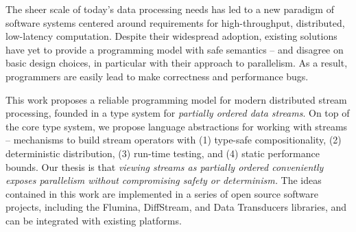 The sheer scale of today's data processing needs has led to a new paradigm of software systems centered around requirements for high-throughput, distributed, low-latency computation.
Despite their widespread adoption, existing solutions have yet to provide a programming model with safe semantics -- and disagree on basic design choices, in particular with their approach to parallelism. As a result, \naive{} programmers are easily lead to make correctness and performance bugs.

This work proposes a reliable programming model for modern distributed stream processing, founded in a type system for \emph{partially ordered data streams}. On top of the core type system, we propose language abstractions for working with streams -- mechanisms to build stream operators with (1) type-safe compositionality, (2) deterministic distribution, (3) run-time testing, and (4) static performance bounds. Our thesis is that \emph{viewing streams as partially ordered conveniently exposes parallelism without compromising safety or determinism.} The ideas contained in this work are implemented in a series of open source software projects, including the Flumina, DiffStream, and Data Transducers libraries, and can be integrated with existing platforms.

